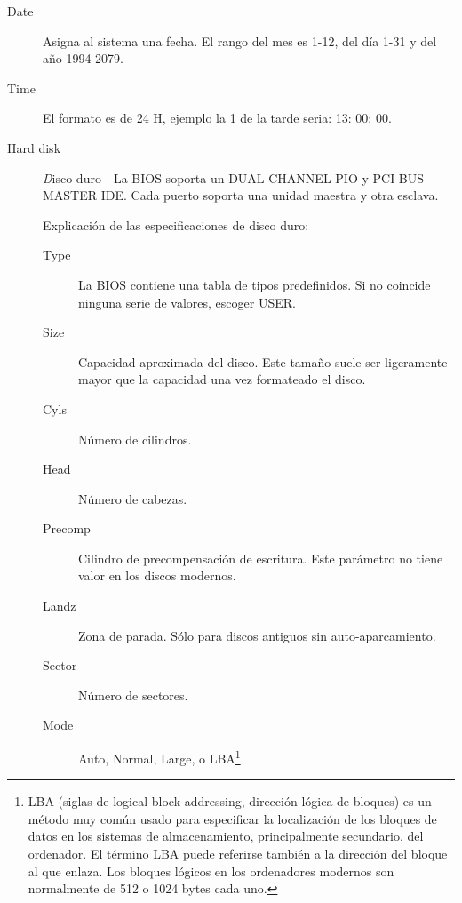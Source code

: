 			\begin{description}
				\item[Date] Asigna al sistema una fecha. El rango del mes es 1-12, del día 1-31 y del año 1994-2079.
				\item[Time] El formato es de 24 H, ejemplo la 1 de la tarde seria: 13: 00: 00.
				\item[Hard disk] {\emph Disco duro} - La BIOS soporta un
					DUAL-CHANNEL PIO y PCI BUS MASTER IDE. Cada puerto soporta
					una unidad maestra y otra esclava.

					{\large Explicación de las especificaciones de disco duro:}
                
					\begin{description}
						\item[Type] La BIOS contiene una tabla de tipos
							predefinidos. Si no coincide ninguna serie de
							valores, escoger USER.
						\item[Size] Capacidad aproximada del disco. Este tamaño
							suele ser ligeramente mayor que la capacidad una
							vez formateado el disco.
						\item[Cyls] Número de cilindros.
						\item[Head] Número de cabezas.
						\item[Precomp] Cilindro de precompensación de
							escritura. Este parámetro no tiene valor en los
							discos modernos.
					    \item[Landz] Zona de parada. Sólo para discos antiguos sin auto-aparcamiento.
					    \item[Sector] Número de sectores.
						\item[Mode] Auto, Normal, Large, o LBA\footnote{LBA
							(siglas de logical block addressing, dirección
							lógica de bloques) es un método muy común usado
							para especificar la localización de los bloques de
							datos en los sistemas de almacenamiento,
							principalmente secundario, del ordenador. El
							término LBA puede referirse también a la dirección
							del bloque al que enlaza.  Los bloques lógicos en
							los ordenadores modernos son normalmente de 512 o
							1024 bytes cada uno.}


\end{description}
\end{description}
